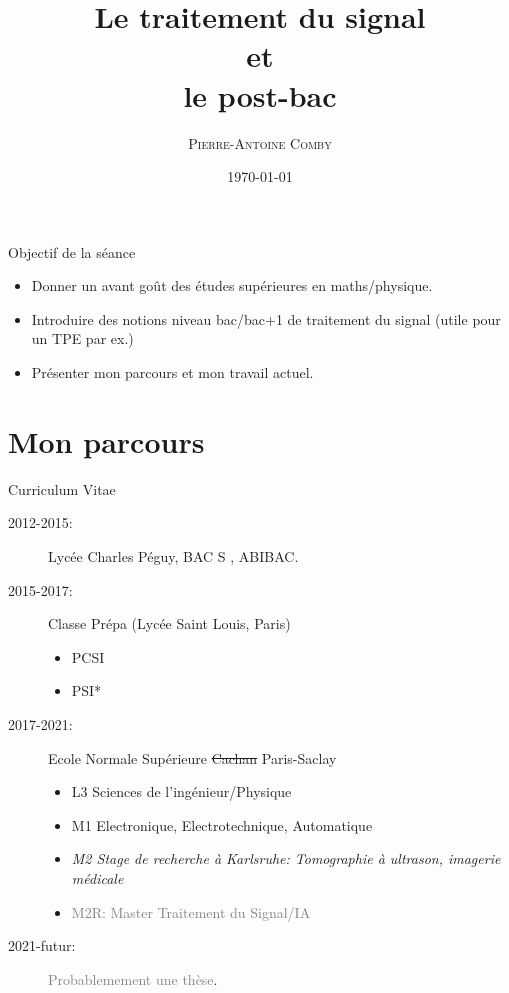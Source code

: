 \documentclass[handout]{beamer}
\title{Le traitement du signal \\et\\ le post-bac}
\subtitle{}
\author[]{\textsc{Pierre-Antoine Comby}}
\institute{pierre-antoine.comby@ens-paris-saclay.fr}
\date{\today}
\begin{document}
\begin{frame}
   \titlepage
\end{frame}

\begin{frame}{Objectif de la séance}
  \begin{itemize}
    \item Donner un avant goût des études supérieures en maths/physique.
    \item Introduire des notions niveau bac/bac+1 de traitement du signal (utile pour un TPE par ex.)
    \item Présenter mon parcours et mon travail actuel.
  \end{itemize}
\end{frame}

\section{Mon parcours}
\label{sec:label}
\begin{frame}{Curriculum Vitae}
  \begin{description}
    \item[2012-2015:] Lycée Charles Péguy, BAC S , ABIBAC.
    \item[2015-2017:] Classe Prépa (Lycée Saint Louis, Paris)
      \begin{itemize}
        \item PCSI
        \item PSI*
      \end{itemize}
    \item[2017-2021:] Ecole Normale Supérieure \sout{Cachan} Paris-Saclay
      \begin{itemize}
        \item L3 Sciences de l'ingénieur/Physique
        \item M1 Electronique, Electrotechnique, Automatique
        \item \textit{M2 Stage de recherche à Karlsruhe: Tomographie à ultrason, imagerie médicale}
        \item \textcolor{gray}{M2R: Master Traitement du Signal/IA}
      \end{itemize}
    \item[2021-futur:] \textcolor{gray}{Probablemement une thèse}.
  \end{description}
\end{frame}
\end{document}
